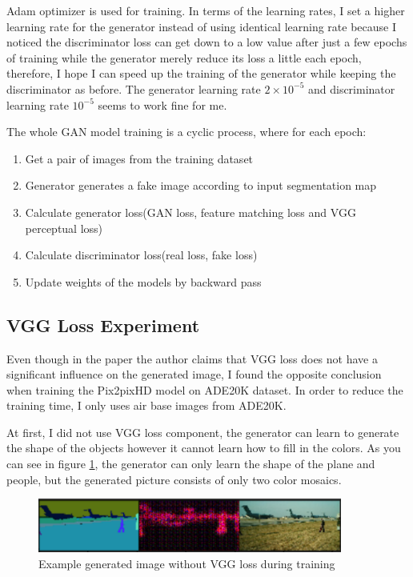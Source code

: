 Adam optimizer is used for training.
In terms of the learning rates, I set a higher learning rate for the generator instead of using 
identical learning rate because I noticed the discriminator loss can get down to a low value 
after just a few epochs of training while the generator merely reduce its loss a little 
each epoch, therefore, I hope I can speed up the training of the generator while keeping the 
discriminator as before. The generator learning rate $2\times10^{-5}$ and discriminator learning 
rate $10^{-5}$ seems to work fine for me. 

The whole GAN model training is a cyclic process, where for each epoch:
\begin{enumerate}
    \item Get a pair of images from the training dataset
    \item Generator generates a fake image according to input segmentation map
    \item Calculate generator loss(GAN loss, feature matching loss and VGG perceptual loss)
    \item Calculate discriminator loss(real loss, fake loss)
    \item Update weights of the models by backward pass
\end{enumerate}

\subsection{VGG Loss Experiment}
Even though in the paper the author claims that VGG loss does not have a significant influence on 
the generated image, I found the opposite conclusion when training the Pix2pixHD model on ADE20K 
dataset. In order to reduce the training time, I only uses air base images from ADE20K. 

At first, 
I did not use VGG loss component, the generator can learn to generate the shape of the objects 
however it cannot learn how to fill in the colors. As you can see in figure \ref{fig:without-VGG}, 
the generator can only learn the shape of the plane and people, but the generated picture 
consists of only two color mosaics.
\begin{figure}[H]
    \begin{center}
    \includegraphics[width=10cm]{figures/without-VGG}
    \end{center}
    \caption{Example generated image without VGG loss during training}
    \label{fig:without-VGG}
\end{figure}

